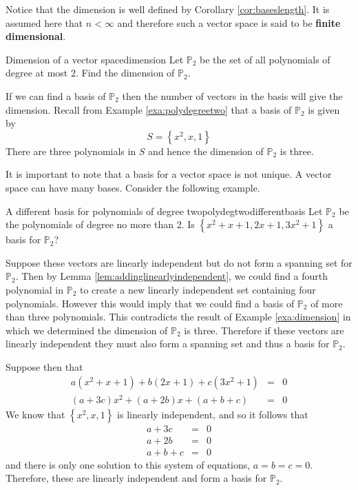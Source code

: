 Notice that the dimension is well defined by Corollary \ref{cor:baseslength}. It is assumed here
that $n<\infty $ and therefore such a vector space is said to be \textbf{finite
dimensional}.

\begin{example}{Dimension of a vector space}{dimension}
Let $\mathbb{P}_2$ be the set of all polynomials of degree at most $2$. Find the dimension of $\mathbb{P}_2$. 
\end{example}

\begin{solution}
If we can find a basis of $\mathbb{P}_2$ then the number of vectors in the basis will give the dimension. Recall from Example \ref{exa:polydegreetwo} that a basis of $\mathbb{P}_2$ is given by 
\[
S  = \left\{ x^2, x, 1 \right\}
\]
There are three polynomials in $S$ and hence the dimension of $\mathbb{P}_2$ is three. 
\end{solution}

It is important to note that a basis for a vector space is not unique. A vector space can have many bases. Consider the following example.

\begin{example}{A different basis for polynomials of degree two}{polydegtwodifferentbasis}
Let $\mathbb{P}_2$ be the polynomials of degree no more than 2. Is $\left\{
x^{2}+x+1,2x+1,3x^{2}+1\right\} $ a basis for $\mathbb{P}_2$?
\end{example}

\begin{solution}
Suppose these vectors are linearly independent but do not form a spanning set for $\mathbb{P}_2$. Then by Lemma \ref{lem:addinglinearlyindependent}, we could find a fourth polynomial in $\mathbb{P}_2$ to create a new linearly independent 
set containing four polynomials. However this would imply that we could find a basis of $\mathbb{P}_2$ of more than three polynomials. This contradicts the result of Example \ref{exa:dimension} in which we determined the dimension of $\mathbb{P}_2$ is three.  Therefore if these vectors are linearly independent they must also form a spanning set and thus a basis for $\mathbb{P}_2$. 

Suppose then that 
\begin{eqnarray*}
a\left( x^{2}+x+1\right) +b\left( 2x+1\right) +c\left( 3x^{2}+1\right) &=& 0\\
\left( a+3c\right) x^{2}+\left( a+2b\right) x+\left( a+b+c\right) &=& 0 
\end{eqnarray*}
We know that $\left\{ x^2, x, 1 \right\}$ is linearly independent, and so it follows that  
\begin{eqnarray*}
a+3c &=& 0 \\
a+2b &=& 0 \\
a+b+c &=& 0
\end{eqnarray*}
and there is only one solution to this system of equations, $a=b=c=0$.
Therefore, these are linearly independent and form a basis for $\mathbb{P}_2$.
\end{solution}

